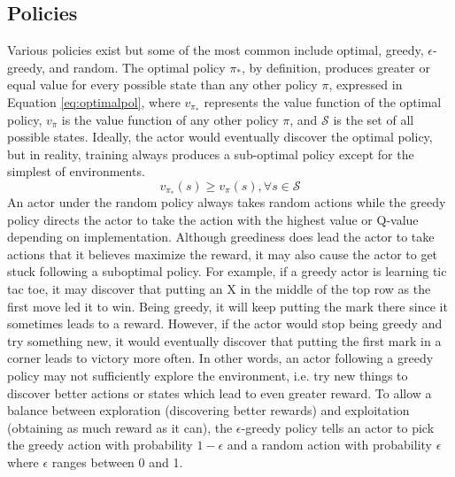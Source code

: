 \subsection{Policies}
Various policies exist but some of the most common include optimal, greedy, $\epsilon$-greedy, and random. The optimal policy $\pi_*$, by definition, produces greater or equal value for every possible state than any other policy $\pi$, expressed in Equation \ref{eq:optimalpol}, where $v_{\pi_*}$ represents the value function of the optimal policy, $v_{\pi}$ is the value function of any other policy $\pi$, and $\mathcal{S}$ is the set of all possible states. Ideally, the actor would eventually discover the optimal policy, but in reality, training always produces a sub-optimal policy except for the simplest of environments. 
\begin{equation}
	\label{eq:optimalpol}
v_{\pi_*}(s) \geq v_{\pi}(s), \forall s \in \mathcal{S}
\end{equation}
An actor under the random policy always takes random actions while the greedy policy directs the actor to take the action with the highest value or Q-value depending on implementation. Although greediness does lead the actor to take actions that it believes maximize the reward, it may also cause the actor to get stuck following a suboptimal policy. For example, if a greedy actor is learning tic tac toe, it may discover that putting an X in the middle of the top row as the first move led it to win. Being greedy, it will keep putting the mark there since it sometimes leads to a reward. However, if the actor would stop being greedy and try something new, it would eventually discover that putting the first mark in a corner leads to victory more often. In other words, an actor following a greedy policy may not sufficiently explore the environment, i.e. try new things to discover better actions or states which lead to even greater reward. To allow a balance between exploration (discovering better rewards) and exploitation (obtaining as much reward as it can), the $\epsilon$-greedy policy tells an actor to pick the greedy action with probability $1-\epsilon$ and a random action with probability $\epsilon$ where $\epsilon$ ranges between 0 and 1. 


